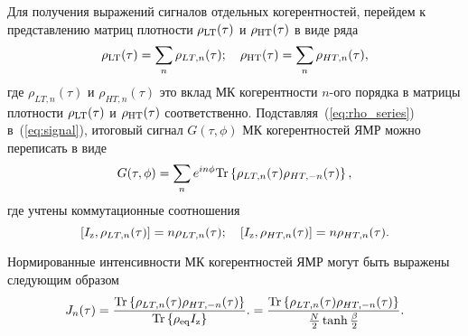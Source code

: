 Для получения выражений сигналов отдельных когерентностей,
перейдем к представлению матриц плотности
$\rho_\mathrm{LT} (\tau)$ и $\rho_\mathrm{HT} (\tau)$
в виде ряда
%
\begin{equation}\label{eq:rho_series}
  \rho_\mathrm{LT} (\tau) = \sum_n \rho_{LT, n}(\tau); \quad
  \rho_\mathrm{HT} (\tau) = \sum_n \rho_{HT, n}(\tau),
\end{equation}
%
где $\rho_{LT, n} (\tau)$ и  $\rho_{HT, n} (\tau)$
это вклад МК когерентности $n$-ого порядка
в матрицы плотности $\rho_\mathrm{LT} (\tau)$ и $\rho_\mathrm{HT} (\tau)$ соответственно.
Подставляя~(\ref{eq:rho_series}) в~(\ref{eq:signal}), итоговый сигнал $G(\tau, \phi)$ МК когерентностей ЯМР можно переписать в виде
%
\begin{equation}
    \label{eq:signal_series}
    G(\tau, \phi) = \sum\limits_n
    e^{in\phi}\mathrm{Tr} \left\{ 
    \rho_{LT, n}(\tau) \rho_{HT, -n} (\tau)
     \right\},
\end{equation}
%
где учтены коммутационные соотношения
%
\begin{equation}
    \left[I_\mathrm{z}, \rho_{LT, n} (\tau) \right] = n  \rho_{LT, n} (\tau);
    \quad
    \left[I_\mathrm{z}, \rho_{HT, n} (\tau) \right] = n  \rho_{HT, n} (\tau).
\end{equation}

Нормированные интенсивности МК когерентностей ЯМР могут быть выражены следующим образом
%
\begin{equation}\label{eq:coherence}
    J_n(\tau)
    = \dfrac{
       \mathrm{Tr} \left\{ 
        \rho_{LT, n}(\tau) \rho_{HT, -n} (\tau)
         \right\}
    }{\mathrm{Tr} \left\{ \rho_{\mathrm{eq}}I_\mathrm{z} \right\}}.
    = \dfrac{
       \mathrm{Tr} \left\{ 
        \rho_{LT, n}(\tau) \rho_{HT, -n} (\tau)
         \right\}
    }{\frac N 2 \tanh \frac \beta 2}.
\end{equation}

